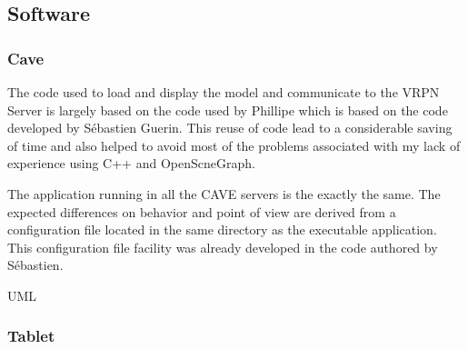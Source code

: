 \subsection{Software}
\subsubsection{Cave}
The code used to load and display the model and communicate to the VRPN Server is largely based on the code used by Phillipe which is based on the code developed by Sébastien Guerin. This reuse of code lead to a considerable saving of time and also helped to avoid most of the problems associated with my lack of experience using C++ and OpenScneGraph.

The application running in all the CAVE servers is the exactly the same. The expected differences on behavior and point of view are derived from a configuration file located in the same directory as the executable application. This configuration file facility was already developed in the code authored by Sébastien.

UML
\subsubsection{Tablet}

